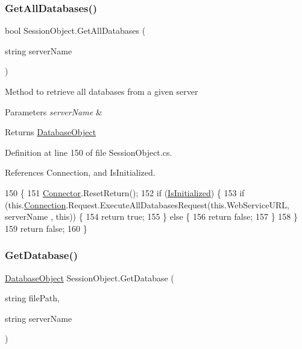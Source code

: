 \subsubsection{\texorpdfstring{Get\+All\+Databases()}{GetAllDatabases()}}
{\footnotesize\ttfamily bool Session\+Object.\+Get\+All\+Databases (\begin{DoxyParamCaption}\item[{string}]{server\+Name }\end{DoxyParamCaption})}



Method to retrieve all databases from a given server 


\begin{DoxyParams}{Parameters}
{\em server\+Name} & \\
\hline
\end{DoxyParams}
\begin{DoxyReturn}{Returns}
\mbox{\hyperlink{class_database_object}{Database\+Object}}
\end{DoxyReturn}


Definition at line 150 of file Session\+Object.\+cs.



References Connection, and Is\+Initialized.


\begin{DoxyCode}
150                                                    \{
151         \mbox{\hyperlink{class_connector}{Connector}}.ResetReturn();
152         \textcolor{keywordflow}{if} (\mbox{\hyperlink{class_session_object_ae0885b9054fc3ce287307ac16ff69990}{IsInitialized}}) \{
153             \textcolor{keywordflow}{if} (this.\mbox{\hyperlink{class_session_object_a014bdbf705a753540e19bfb53030c55c}{Connection}}.Request.ExecuteAllDatabasesRequest(\textcolor{keyword}{this}.WebServiceURL, serverName
      , \textcolor{keyword}{this})) \{
154                 \textcolor{keywordflow}{return} \textcolor{keyword}{true};
155             \} \textcolor{keywordflow}{else} \{
156                 \textcolor{keywordflow}{return} \textcolor{keyword}{false};
157             \}
158         \}
159         \textcolor{keywordflow}{return} \textcolor{keyword}{false};
160     \}
\end{DoxyCode}
\mbox{\label{class_session_object_aa4871ea2dac4215bef0274a2bd71ae72}} 
\subsubsection{\texorpdfstring{Get\+Database()}{GetDatabase()}}
{\footnotesize\ttfamily \mbox{\hyperlink{class_database_object}{Database\+Object}} Session\+Object.\+Get\+Database (\begin{DoxyParamCaption}\item[{string}]{file\+Path,  }\item[{string}]{server\+Name }\end{DoxyParamCaption})}



